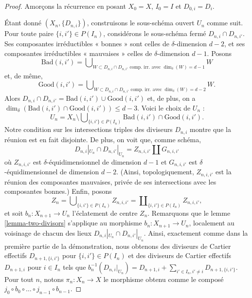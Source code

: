 \begin{proof}
\medskip\noindent
Amorçons la récurrence en posant $X_0 = X$,
$I_0 = I$ et $D_{0, i} = D_i$.

\medskip\noindent
Étant donné $(X_n, \{D_{n, i}\})$, construisons le sous-schéma ouvert
$U_n$ comme suit. Pour toute paire $\{i, i'\} \in P(I_n)$, considérons
le sous-schéma fermé $D_{n, i} \cap D_{n, i'}$. Ses composantes irréductibles
« bonnes » sont celles de $\delta$-dimension $d - 2$, et ses composantes irréductibles
« mauvaises » celles de $\delta$-dimension $d - 1$.
Posons
$$
\text{Bad}(i, i')
=
\bigcup\nolimits_{W \subset D_{n, i} \cap D_{n, i'}
\text{ comp.\ irr.\ avec }\dim_\delta(W) = d - 1} W
$$
et, de même,
$$
\text{Good}(i, i')
=
\bigcup\nolimits_{W \subset D_{n, i} \cap D_{n, i'}
\text{ comp.\ irr.\ avec }\dim_\delta(W) = d - 2} W.
$$
Alors $D_{n, i} \cap D_{n, i'} = \text{Bad}(i, i') \cup \text{Good}(i, i')$
et, de plus, on a
$\dim_\delta(\text{Bad}(i, i') \cap \text{Good}(i, i')) \leq d - 3$.
Voici le choix de $U_n$ :
$$
U_n
=
X_n
\setminus
\bigcup\nolimits_{\{i, i'\} \in P(I_n)}
\text{Bad}(i, i') \cap \text{Good}(i, i').
$$
Notre condition sur les intersections triples des diviseurs $D_{n, i}$
montre que la réunion est en fait disjointe. De plus,
on voit que, comme schéma,
$$
D_{n, i}|_{U_n} \cap D_{n, i'}|_{U_n}
=
Z_{n, i, i'} \amalg G_{n, i, i'}
$$
où $Z_{n, i, i'}$ est $\delta$-équidimensionnel de dimension $d - 1$
et $G_{n, i, i'}$ est $\delta$-équidimensionnel de dimension $d - 2$.
(Ainsi, topologiquement, $Z_{n, i, i'}$ est la réunion des composantes mauvaises,
privée de ses intersections avec les composantes bonnes.) Enfin, posons
$$
Z_n =
\bigcup\nolimits_{\{i, i'\} \in P(I_n)} Z_{n, i, i'} =
\coprod\nolimits_{\{i, i'\} \in P(I_n)} Z_{n, i, i'},
$$
et soit $b_n : X_{n + 1} \to U_n$ l'éclatement de centre $Z_n$.
Remarquons que le lemme \ref{lemma-two-divisors}
s'applique au morphisme $b_n : X_{n + 1} \to U_n$, localement au voisinage
de chacun des lieux $D_{n, i}|_{U_n} \cap D_{n, i'}|_{U_n}$. Ainsi,
exactement comme dans la première partie de la démonstration, nous obtenons des diviseurs de
Cartier effectifs $D_{n + 1, \{i, i'\}}$ pour $\{i, i'\} \in P(I_n)$
et des diviseurs de Cartier effectifs $D_{n + 1, i}$ pour $i \in I_n$
tels que
$b_n^{-1}(D_{n, i}|_{U_n}) = D_{n + 1, i} +
\sum\nolimits_{i' \in I_n, i' \not = i} D_{n + 1, \{i, i'\}}$.
Pour tout $n$, notons $\pi_n : X_n \to X$ le morphisme obtenu
comme le composé $j_0 \circ b_0 \circ \ldots \circ j_{n - 1} \circ b_{n - 1}$.


\end{proof}
